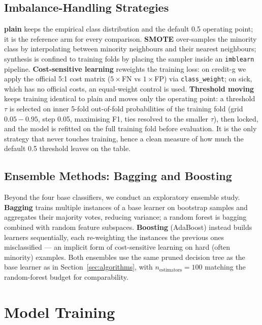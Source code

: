 \subsection{Imbalance-Handling Strategies}
\label{ssec:strategies}
\textbf{plain} keeps the empirical class distribution and the default
0.5 operating point; it is the reference arm for every comparison.
\textbf{SMOTE} over-samples the minority class by interpolating
between minority neighbours and their nearest neighbours; synthesis is
confined to training folds by placing the sampler inside an
\texttt{imblearn} pipeline. \textbf{Cost-sensitive learning} reweights
the training loss: on credit-g we apply the official 5:1 cost matrix
($5\times$FN vs $1\times$FP) via \texttt{class\_weight}; on sick,
which has no official costs, an equal-weight control is used.
\textbf{Threshold moving} keeps training identical to plain and moves
only the operating point: a threshold $\tau$ is selected on inner
5-fold out-of-fold probabilities of the training fold (grid
$0.05{-}0.95$, step 0.05, maximising F1, ties resolved to the smaller
$\tau$), then locked, and the model is refitted on the full training
fold before evaluation. It is the only strategy that never touches
training, hence a clean measure of how much the default 0.5 threshold
leaves on the table.

\subsection{Ensemble Methods: Bagging and Boosting}
\label{ssec:ensemble-concepts}
Beyond the four base classifiers, we conduct an exploratory ensemble
study. \textbf{Bagging} trains multiple instances of a base learner on
bootstrap samples and aggregates their majority votes, reducing
variance; a random forest is bagging combined with random feature
subspaces. \textbf{Boosting} (AdaBoost) instead builds learners
sequentially, each re-weighting the instances the previous ones
misclassified --- an implicit form of cost-sensitive learning on hard
(often minority) examples. Both ensembles use the same pruned decision
tree as the base learner as in Section~\ref{sec:algorithms}, with
$n_{\text{estimators}}=100$ matching the random-forest budget for
comparability.

\section{Model Training}
\label{sec:training}

